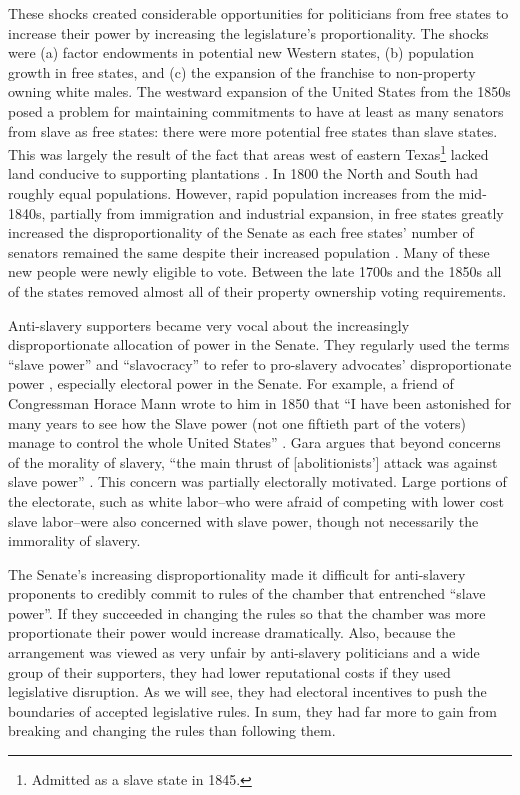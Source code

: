 \documentclass[a4paper]{article}\usepackage[]{graphicx}\usepackage[]{color}
\begin{document}
These shocks created considerable opportunities for politicians from free states to increase their power by increasing the legislature's proportionality. The shocks were (a) factor endowments in potential new Western states, (b) population growth in free states, and (c) the expansion of the franchise to non-property owning white males. The westward expansion of the United States from the 1850s posed a problem for maintaining commitments to have at least as many senators from slave as free states: there were more potential free states than slave states. This was largely the result of the fact that areas west of eastern Texas\footnote{Admitted as a slave state in 1845.} lacked land conducive to supporting plantations \cite[]{Ramsdell1929,Weingast1998}. In 1800 the North and South had roughly equal populations. However, rapid population increases from the mid-1840s, partially from immigration and industrial expansion, in free states greatly increased the disproportionality of the Senate as each free states' number of senators remained the same despite their increased population \cite[184]{Weingast1998}. Many of these new people were newly eligible to vote. Between the late 1700s and the 1850s all of the states removed almost all of their property ownership voting requirements.

Anti-slavery supporters became very vocal about the increasingly disproportionate allocation of power in the Senate. They regularly used the terms ``slave power'' and ``slavocracy'' to refer to pro-slavery advocates' disproportionate power \citep{richards2000}, especially electoral power in the Senate. For example, a friend of Congressman Horace Mann wrote to him in 1850 that ``I have been astonished for many years to see how the Slave power (not one fiftieth part of the voters) manage to control the whole United States'' \citep[quoted in][6]{Gara1969}. Gara argues that beyond concerns of the morality of slavery, ``the main thrust of [abolitionists'] attack was against slave power'' \citeyearpar[6]{Gara1969}. This concern was partially electorally motivated. Large portions of the electorate, such as white labor--who were afraid of competing with lower cost slave labor--were also concerned with slave power, though not necessarily the immorality of slavery.

The Senate's increasing disproportionality made it difficult for anti-slavery proponents to credibly commit to rules of the chamber that entrenched ``slave power''. If they succeeded in changing the rules so that the chamber was more proportionate their power would increase dramatically. Also, because the arrangement was viewed as very unfair by anti-slavery politicians and a wide group of their supporters, they had lower reputational costs if they used legislative disruption. As we will see, they had electoral incentives to push the boundaries of accepted legislative rules. In sum, they had far more to gain from breaking and changing the rules than following them.
\end{document}

